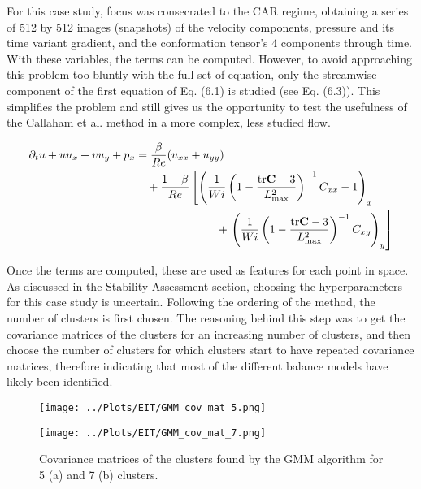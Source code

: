 \documentclass[12pt]{report} %
\begin{document}
For this case study, focus was consecrated to the CAR regime, obtaining a series of 512 by 512 images (snapshots) of the velocity components, pressure and its time variant gradient, and the conformation tensor's 4 components through time. With these variables, the terms can be computed. However, to avoid approaching this problem too bluntly with the full set of equation, only the streamwise component of the first equation of Eq. (6.1) is studied (see Eq. (6.3)). This simplifies the problem and still gives us the opportunity to test the usefulness of the Callaham et al. method in a more complex, less studied flow.

\begin{equation}
  \begin{aligned}
  \partial_{t}u + u u_{x} + v u_{y} + p_{x} &= \frac{\beta}{Re} (u_{xx} + u_{yy}) \\
  &\quad + \frac{1 - \beta}{Re} \left[ \left( \frac{1}{Wi} \left(1 - \frac{\text{tr} \mathbf{C} - 3}{L_{\text{max}}^{2}} \right)^{-1} C_{xx} - 1 \right)_{x} \right. \\
  &\hspace{2.5cm} + \left. \left( \frac{1}{Wi} \left(1 - \frac{\text{tr} \mathbf{C} - 3}{L_{\text{max}}^{2}} \right)^{-1} C_{xy} \right)_{y} \right]
  \end{aligned}
\end{equation}

Once the terms are computed, these are used as features for each point in space. As discussed in the Stability Assessment section, choosing the hyperparameters for this case study is uncertain. Following the ordering of the method, the number of clusters is first chosen. The reasoning behind this step was to get the covariance matrices of the clusters for an increasing number of clusters, and then choose the number of clusters for which clusters start to have repeated covariance matrices, therefore indicating that most of the different balance models have likely been identified.

\begin{figure}[htbp]
  \centering
  \begin{minipage}{0.9\textwidth}
    \centering
    \texttt{[image: ../Plots/EIT/GMM\_cov\_mat\_5.png]}
    \subcaption{}
  \end{minipage}

  \begin{minipage}{0.8\textwidth}
    \centering
    \texttt{[image: ../Plots/EIT/GMM\_cov\_mat\_7.png]}
    \subcaption{}
  \end{minipage}

  \caption{Covariance matrices of the clusters found by the GMM algorithm for 5 (a) and 7 (b) clusters.}
  \label{fig:EIT_GMM_results_1}

\end{figure}
\end{document}
